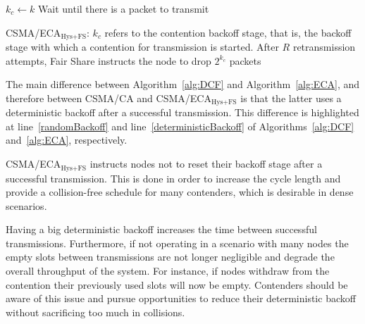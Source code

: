 \begin{center}
\begin{minipage}{1.1\linewidth}
\begin{minipage}{0.45\linewidth}
\begin{algorithm}[H]
{{	$k_{c} \leftarrow k$\;
	  }
	  Wait until there is a packet to transmit\;
	}	
	\vspace{0.2cm}
	\caption{CSMA/ECA$_{\text{Hys+FS}}$: $k_{c}$ refers to the contention backoff stage, that is, the backoff stage with which a contention for transmission is started. After $R$ retransmission attempts, Fair Share instructs the node to drop $2^{k_{c}}$ packets}
	\label{alg:ECA}
	\end{algorithm}
\end{minipage}
\end{minipage}
\end{center}

	
The main difference between Algorithm~\ref{alg:DCF} and Algorithm~\ref{alg:ECA}, and therefore between CSMA/CA and CSMA/ECA$_{\text{Hys+FS}}$ is that the latter uses a deterministic backoff after a successful transmission. This difference is highlighted at line~\ref{randomBackoff} and line~\ref{deterministicBackoff} of Algorithms~\ref{alg:DCF} and~\ref{alg:ECA}, respectively.

CSMA/ECA$_{\text{Hys+FS}}$ instructs nodes not to reset their backoff stage after a successful transmission. This is done in order to increase the cycle length and provide a collision-free schedule for many contenders, which is desirable in dense scenarios.


Having a big deterministic backoff increases the time between successful transmissions. Furthermore, if not operating in a scenario with many nodes the empty slots between transmissions are not longer negligible and degrade the overall throughput of the system. For instance, if nodes withdraw from the contention their previously used slots will now be empty. Contenders should be aware of this issue and pursue opportunities to reduce their deterministic backoff without sacrificing too much in collisions. 

